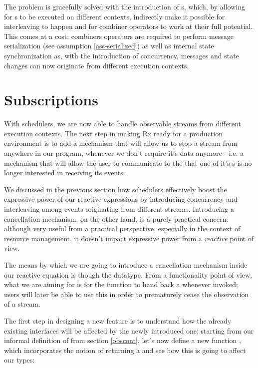 The problem is gracefully solved with the introduction of s, which, by allowing for s to be executed on different contexts, indirectly make it possible for interleaving to happen and for combiner operators to work at their full potential. This comes at a cost: combiners operators are required to perform message serialization (see assumption \ref{ass-serialized}) as well as internal state synchronization as, with the introduction of concurrency, messages and state changes can now originate from different execution contexts.

\section{Subscriptions}
\label{sec:subscriptions}

With schedulers, we are now able to handle observable streams from different execution contexts. The next step in making Rx ready for a production environment is to add a mechanism that will allow us to stop a stream from anywhere in our program, whenever we don't require it's data anymore - i.e. a mechanism that will allow the user to communicate to the  that one of it's s is no longer interested in receiving its events. 

We discussed in the previous section how schedulers effectively boost the expressive power of our reactive expressions by introducing concurrency and interleaving among events originating from different streams. Introducing a cancellation mechanism, on the other hand, is a purely practical concern: although very useful from a practical perspective, especially in the context of resource management, it doesn't impact expressive power from a \textit{reactive} point of view.

The means by which we are going to introduce a cancellation mechanism inside our reactive equation is though the  datatype. From a functionality point of view, what we are aiming for is for the  function to hand back a  whenever invoked; users will later be able to use this  in order to prematurely cease the observation of a stream.

The first step in designing a new feature is to understand how the already existing interfaces will be affected by the newly introduced one; starting from our informal definition of  from section \ref{obscont}, let's now define a new function \code{(\%)}, which incorporates the notion of returning a  and see how this is going to affect our types:\\

